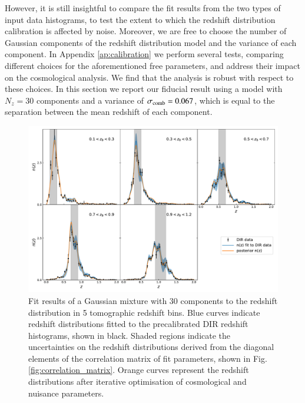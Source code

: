 \documentclass{aa}
\begin{document}
However, it is still insightful to compare the fit results from the two types of input data histograms, to test the extent to which the redshift distribution calibration is affected by noise. Moreover, we are free to choose the number of Gaussian components of the redshift distribution model and the variance of each component. In Appendix \ref{ap:calibration} we perform several tests, comparing different choices for the aforementioned free parameters, and address their impact on the cosmological analysis. We find that the analysis is robust with respect to these choices. In this section we report our fiducial result using a model with $N_z = 30$ components and a variance of $\sigma_{\rm comb} = 0.067$, which is equal to the separation between the mean redshift of each component. 
\begin{figure}
\centering
\includegraphics[width=\linewidth]{plots/optimisation_result.pdf}
\caption{Fit results of a Gaussian mixture with 30 components to the redshift distribution in 5 tomographic redshift bins. Blue curves indicate redshift distributions fitted to the precalibrated DIR redshift histograms, shown in black. Shaded regions indicate the uncertainties on the redshift distributions derived from the diagonal elements of the correlation matrix of fit parameters, shown in Fig. \ref{fig:correlation_matrix}. Orange curves represent the redshift distributions after iterative optimisation of cosmological and nuisance parameters.}
\label{fig:comb}
\end{figure}
\end{document}
